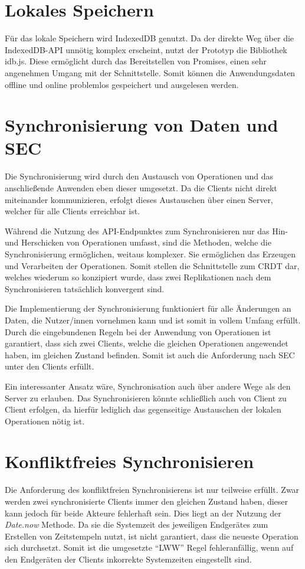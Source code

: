 \documentclass[a4paper, 12pt]{scrreprt}
\begin{document}
\section{Lokales Speichern}
Für das lokale Speichern wird IndexedDB genutzt. Da der direkte Weg über die IndexedDB-API unnötig komplex erscheint, nutzt der Prototyp die Bibliothek idb.js. Diese ermöglicht durch das Bereitstellen von Promises, einen sehr angenehmen Umgang mit der Schnittstelle. Somit können die Anwendungsdaten offline und online problemlos gespeichert und ausgelesen werden.

\section{Synchronisierung von Daten und SEC}

Die Synchronisierung wird durch den Austausch von Operationen und das anschließende Anwenden eben dieser umgesetzt. Da die Clients nicht direkt miteinander kommunizieren, erfolgt dieses Austauschen über einen Server, welcher für alle Clients erreichbar ist. 

Während die Nutzung des API-Endpunktes zum Synchronisieren nur das Hin- und Herschicken von Operationen umfasst, sind die Methoden, welche die Synchronisierung ermöglichen, weitaus komplexer. Sie ermöglichen das Erzeugen und Verarbeiten der Operationen. Somit stellen die Schnittstelle zum CRDT dar, welches wiederum so konzipiert wurde, dass zwei Replikationen nach dem Synchronisieren tatsächlich konvergent sind.

Die Implementierung der Synchronisierung funktioniert für alle Änderungen an Daten, die Nutzer/innen vornehmen kann und ist somit in vollem Umfang erfüllt. Durch die eingebundenen Regeln bei der Anwendung von Operationen ist garantiert, dass sich zwei Clients, welche die gleichen Operationen angewendet haben, im gleichen Zustand befinden. Somit ist auch die Anforderung nach \ac{SEC} unter den Clients erfüllt. 

Ein interessanter Ansatz wäre, Synchronisation auch über andere Wege als den Server zu erlauben. Das Synchronisieren könnte schließlich auch von Client zu Client erfolgen, da hierfür lediglich das gegenseitige Austauschen der lokalen Operationen nötig ist.

\section{Konfliktfreies Synchronisieren}
Die Anforderung des konfliktfreien Synchronisierens ist nur teilweise erfüllt. Zwar werden zwei synchronisierte Clients immer den gleichen Zustand haben, dieser kann jedoch für beide Akteure fehlerhaft sein. Dies liegt an der Nutzung der \textit{Date.now} Methode. Da sie die Systemzeit des jeweiligen Endgerätes zum Erstellen von Zeitstempeln nutzt, ist nicht garantiert, dass die neueste Operation sich durchsetzt. Somit ist die umgesetzte \enquote{LWW} Regel fehleranfällig, wenn auf den Endgeräten der Clients inkorrekte Systemzeiten eingestellt sind.
\end{document}
